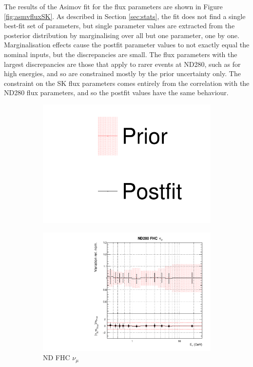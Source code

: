 The results of the Asimov fit for the flux parameters are shown in Figure \ref{fig:asmvfluxSK}. As described in Section \ref{sec:stats}, the fit does not find a single best-fit set of parameters, but single parameter values are extracted from the posterior distribution by marginalising over all but one parameter, one by one. Marginalisation effects cause the postfit parameter values to not exactly equal the nominal inputs, but the discrepancies are small. The flux parameters with the largest discrepancies are those that apply to rarer events at ND280, such as for high energies, and so are constrained mostly by the prior uncertainty only. The constraint on the SK flux parameters comes entirely from the correlation with the ND280 flux parameters, and so the postfit values have the same behaviour.

\begin{figure}
\centering
\begin{subfigure}{0.95\textwidth}
  \centering
  \includegraphics[width=0.24\linewidth]{figs/asmv_leg}
\end{subfigure}
\begin{subfigure}{0.24\textwidth}
  \centering
  \includegraphics[width=0.95\linewidth]{figs/asmvflux0}
  \caption{ND FHC $\nu_{\mu}$}
  \label{fig:}
\end{subfigure}
\begin{subfigure}{0.24\textwidth}
  \centering

\end{subfigure}
\end{figure}
